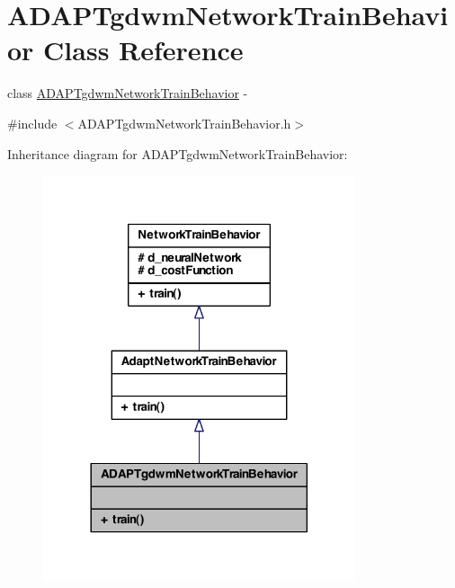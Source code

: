 \hypertarget{class_a_d_a_p_tgdwm_network_train_behavior}{
\section{ADAPTgdwmNetworkTrainBehavior Class Reference}
\label{class_a_d_a_p_tgdwm_network_train_behavior}
}


class \hyperlink{class_a_d_a_p_tgdwm_network_train_behavior}{ADAPTgdwmNetworkTrainBehavior} -\/  




{\ttfamily \#include $<$ADAPTgdwmNetworkTrainBehavior.h$>$}



Inheritance diagram for ADAPTgdwmNetworkTrainBehavior:
\nopagebreak
\begin{figure}[H]
\begin{center}
\leavevmode
\includegraphics[width=260pt]{class_a_d_a_p_tgdwm_network_train_behavior__inherit__graph}
\end{center}
\end{figure}


